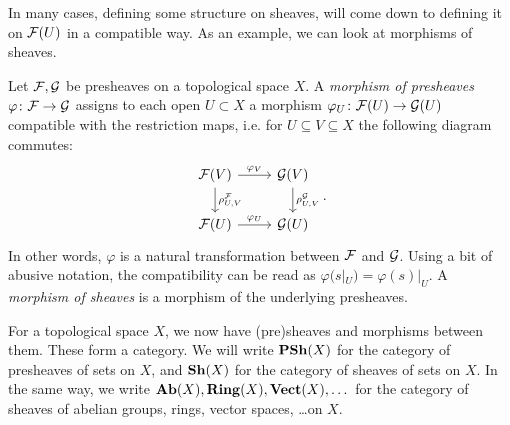 \documentclass{article}
\begin{document}
In many cases, defining some structure on sheaves, will come down
to defining it on $\mathcal{F}(U)$ in a compatible way.
As an example, we can look at morphisms of sheaves.
\begin{definition}
    Let $\mathcal{F}, \mathcal{G}$ be presheaves on a topological space $X$.
    A  \emph{morphism of presheaves} $\varphi \colon \mathcal{F} \to \mathcal{G}$ assigns to
    each open $U\subset X$ a morphism $\varphi_U \colon \mathcal{F}(U) \to \mathcal{G}(U)$
    compatible with the restriction maps, i.e. for $U\subseteq V \subseteq X$
    the following diagram commutes:
    \begin{equation*}
        \begin{tikzcd}
            \mcF(V) \rar["\varphi_V"] \dar["\rho^\mcF_{U,V}"]
            & \mcG(V) \dar["\rho^\mcG_{U,V}"] \\
            \mcF(U) \rar["\varphi_U"]
            & \mcG(U)
        \end{tikzcd}.
    \end{equation*}
    In other words, $\varphi$ is a natural transformation between $\mathcal{F}$ and $\mathcal{G}$.
    Using a bit of abusive notation, the compatibility can be read as
    $\varphi(s|_U) = \varphi(s)|_U$.
    A \emph{morphism of sheaves} is a morphism of the underlying presheaves.
\end{definition}

For a topological space $X$, we now have (pre)sheaves and morphisms between them.
These form a category. We will write $\operatorname{\mathbf{PSh}}(X)$ for the category of presheaves of
sets on $X$, and $\operatorname{\mathbf{Sh}}(X)$ for the category of sheaves of sets on $X$.
In the same way, we write $\operatorname{\mathbf{Ab}}(X), \operatorname{\mathbf{Ring}}(X), \operatorname{\mathbf{Vect}}(X),\dots $ for the category of
sheaves of abelian groups, rings, vector spaces, \dots on $X$.
\end{document}
